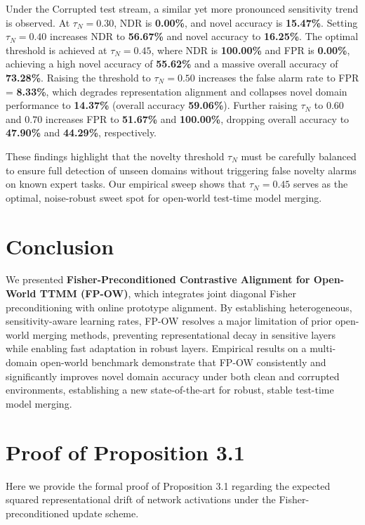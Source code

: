 \documentclass{article}
\theoremstyle{plain}
\theoremstyle{definition}
\theoremstyle{remark}
\begin{document}
Under the Corrupted test stream, a similar yet more pronounced sensitivity trend is observed. At $\tau_N = 0.30$, NDR is \textbf{0.00\%}, and novel accuracy is \textbf{15.47\%}. Setting $\tau_N = 0.40$ increases NDR to \textbf{56.67\%} and novel accuracy to \textbf{16.25\%}. The optimal threshold is achieved at $\tau_N = 0.45$, where NDR is \textbf{100.00\%} and FPR is \textbf{0.00\%}, achieving a high novel accuracy of \textbf{55.62\%} and a massive overall accuracy of \textbf{73.28\%}. Raising the threshold to $\tau_N = 0.50$ increases the false alarm rate to FPR = \textbf{8.33\%}, which degrades representation alignment and collapses novel domain performance to \textbf{14.37\%} (overall accuracy \textbf{59.06\%}). Further raising $\tau_N$ to $0.60$ and $0.70$ increases FPR to \textbf{51.67\%} and \textbf{100.00\%}, dropping overall accuracy to \textbf{47.90\%} and \textbf{44.29\%}, respectively.

These findings highlight that the novelty threshold $\tau_N$ must be carefully balanced to ensure full detection of unseen domains without triggering false novelty alarms on known expert tasks. Our empirical sweep shows that $\tau_N = 0.45$ serves as the optimal, noise-robust sweet spot for open-world test-time model merging.

\section{Conclusion}
We presented \textbf{Fisher-Preconditioned Contrastive Alignment for Open-World TTMM (FP-OW)}, which integrates joint diagonal Fisher preconditioning with online prototype alignment. By establishing heterogeneous, sensitivity-aware learning rates, FP-OW resolves a major limitation of prior open-world merging methods, preventing representational decay in sensitive layers while enabling fast adaptation in robust layers. Empirical results on a multi-domain open-world benchmark demonstrate that FP-OW consistently and significantly improves novel domain accuracy under both clean and corrupted environments, establishing a new state-of-the-art for robust, stable test-time model merging.




\clearpage
\appendix
\onecolumn
\section{Proof of Proposition 3.1}
\label{app:proof}
Here we provide the formal proof of Proposition 3.1 regarding the expected squared representational drift of network activations under the Fisher-preconditioned update scheme.
\end{document}

